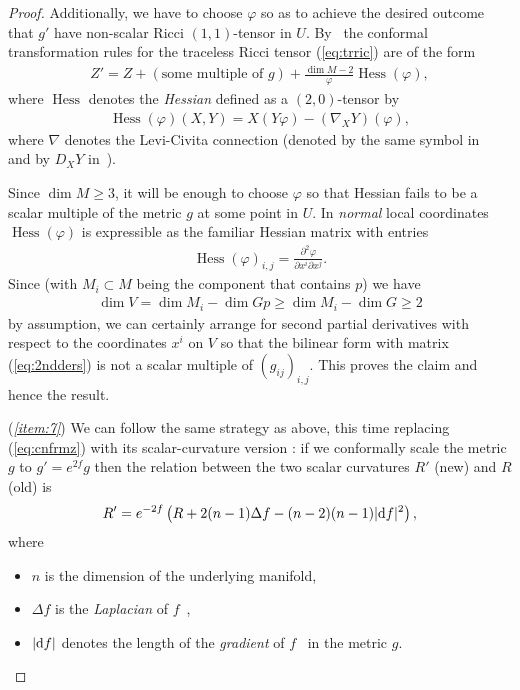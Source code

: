 \documentclass[pdftex]{sigma}%
\numberwithin{equation}{section}
\begin{document}
\begin{proof}
 Additionally, we have to choose $\varphi$ so as to achieve the desired outcome that $g'$ have non-scalar Ricci $(1,1)$-tensor in $U$. By~\cite[equation (1.161b)]{bes} the conformal transformation rules for the traceless Ricci tensor (\ref{eq:trric}) are of the form
 \begin{gather}\label{eq:cnfrmz}
 Z' = Z + (\text{some multiple of }g) + \frac{\dim M-2}{\varphi}\operatorname{Hess}(\varphi),
 \end{gather}
 where $\operatorname{Hess}$ denotes the {\it Hessian} defined \cite[Section~1.54]{bes} as a $(2,0)$-tensor by
 \begin{gather*}
 \operatorname{Hess}(\varphi)(X,Y) = X(Y\varphi) - (\nabla_XY)(\varphi),
 \end{gather*}
 where $\nabla$ denotes the Levi-Civita connection (denoted by the same symbol in~\cite[Section~IV.2]{kn1} and by $D_{X}Y$ in~\cite[Section~1.41]{bes}).

 Since $\dim M\ge 3$, it will be enough to choose $\varphi$ so that Hessian fails to be a scalar multiple of the metric $g$ at some point in $U$. In {\it normal} \cite[Section~1.44]{bes} local coordinates $\operatorname{Hess}(\varphi)$ is expressible as the familiar Hessian matrix with entries
 \begin{gather}\label{eq:2ndders}
 \operatorname{Hess}(\varphi)_{i,j} = \frac{\partial^2 \varphi}{\partial x^i \partial x^j}.
 \end{gather}
 Since (with $M_i\subset M$ being the component that contains $p$) we have
 \begin{gather*}
 \dim V = \dim M_i - \dim Gp\ge \dim M_i-\dim G\ge 2
 \end{gather*}
 by assumption, we can certainly arrange for second partial derivatives with respect to the coordinates $x^i$ on $V$ so that the bilinear form with matrix (\ref{eq:2ndders}) is not a scalar multiple of $(g_{ij})_{i,j}$. This proves the claim and hence the result.

 ({\it \ref{item:7}}) We can follow the same strategy as above, this time replacing (\ref{eq:cnfrmz}) with its scalar-curvature version \cite[Theorem~1.159(f)]{bes}: if we conformally scale the metric $g$ to $g'=e^{2f}g$ then the relation between the two scalar curvatures $R'$ (new) and $R$ (old) is
 \begin{gather*}
 R' = e^{-2f}\left(R + 2(n-1)\Delta f - (n-2)(n-1)|{\rm d}f|^2\right),
 \end{gather*}
 where
 \begin{itemize}\itemsep=0pt
 \item $n$ is the dimension of the underlying manifold,
 \item $\Delta f$ is the {\it Laplacian} of $f$~\cite[Section~1.54c]{bes},
 \item $|{\rm d}f|$ denotes the length of the {\it gradient} of $f$~\cite[Section~1.54a]{bes} in the metric $g$.
 \end{itemize}


\end{proof}
\end{document}
